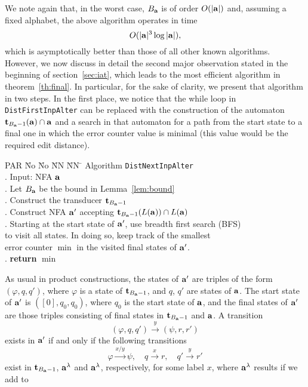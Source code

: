 \documentclass{article}
\theoremstyle{plain}
\theoremstyle{definition}
\theoremstyle{remark}
\renewcommand{\phi}{\varphi}
\newcommand{\xra}[1]{\xrightarrow{#1}}
\newcommand{\e}{\lambda}
\newcommand\tsidp[1]{\trt_{#1}}
\newcommand\db{B}             \newcommand\dbold{D}   \newcommand\pssi{\par\smallskip\indent}
\begin{document}
We note again that, in the worst case, $\db_{\aut}$ is
of order $O(|\mathbf{a}|)$ and, assuming a fixed alphabet, the above algorithm operates in time
$$O(|\mathbf{a}|^3\log|\mathbf{a}|),$$
which is asymptotically better than those of all other
known algorithms. However, we now discuss in detail the second major observation stated in the beginning of section~\ref{sec:iat}, which leads to the most efficient algorithm in theorem~\ref{th:final}. In particular, for the sake of clarity, we present that algorithm in two steps.
In the first place, we notice that the while loop
in \texttt{DistFirstInpAlter}
can be replaced with the construction
of the automaton $\tsidp{{\db_\aut}-1}(\aut)\cap\aut$ and a search
in that automaton for a path from the start state to
a final one in which the error counter value is minimal (this
value would be the required edit distance).
\begin{tabbing}
PAR \= No \= No \= NN \= NN \=\kill
\> Algorithm \texttt{DistNextInpAlter} \\
.\> Input: NFA $\mathbf{a}$ \hspace{4mm} \\
.\> Let ${\db_\aut}$ be the bound in Lemma~\ref{lem:bound}\\
.\> Construct the transducer $\tsidp{{\db_\aut}-1}$ \\
.\> Construct NFA  $\mathbf{a}'$ accepting
        $\tsidp{{\db_\aut}-1}(L(\aut))\cap L(\aut)$\\
.\> Starting at the start state of $\mathbf{a}'$, use breadth first search (BFS) \\
\>   \> to visit all states. In doing so, keep track of the smallest\\
\>   \> error counter $\min$ in the visited final states of $\mathbf{a}'$.\\
. \> \textbf{return} $\min$
\end{tabbing}
As usual in product constructions, the states of $\mathbf{a}'$ are triples of the form
$(\phi,q,q')$, where $\phi$ is a state of $\tsidp{{\db_\aut}-1}$, and $q$, $q'$ are states of $\mathbf{a}$. The start state of $\mathbf{a}'$ is
$([0],q_0,q_0)$, where $q_0$ is the start state of $\mathbf{a}$, and the final states of $\mathbf{a}'$ are those triples consisting of final states in $\tsidp{{\db_\aut}-1}$ and $\mathbf{a}$. A transition
\[
(\phi,q,q')\xra{y}(\psi,r,r')
\]
exists in $\mathbf{a}'$ if and only if the following transitions
\[
\phi\xra{x\slash y}\psi,\quad
q\xra{x} r,\quad
q'\xra{y} r'
\]
exist in $\tsidp{{\db_\aut}-1}$, $\aut^\e$ and $\aut^\e$, respectively,
for some label $x$, where $\aut^\e$ results if we add to
\end{document}
